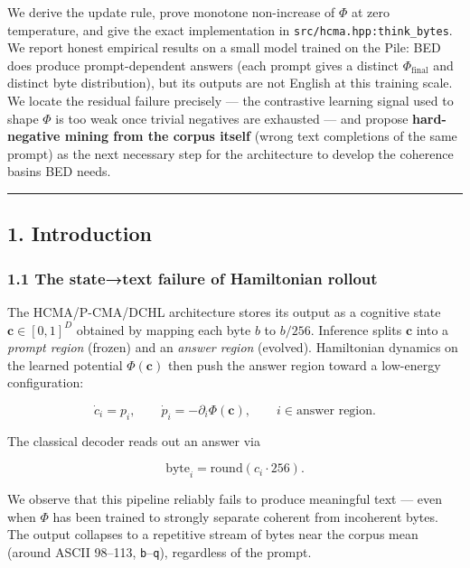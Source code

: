 \documentclass[
  11pt,
  a4paper,
]{article}
\begin{document}
We derive the update rule, prove monotone non-increase of \(\Phi\) at
zero temperature, and give the exact implementation in
\texttt{src/hcma.hpp:think\_bytes}. We report honest empirical results
on a small model trained on the Pile: BED does produce prompt-dependent
answers (each prompt gives a distinct \(\Phi_{\text{final}}\) and
distinct byte distribution), but its outputs are not English at this
training scale. We locate the residual failure precisely --- the
contrastive learning signal used to shape \(\Phi\) is too weak once
trivial negatives are exhausted --- and propose \textbf{hard-negative
mining from the corpus itself} (wrong text completions of the same
prompt) as the next necessary step for the architecture to develop the
coherence basins BED needs.

\begin{center}\rule{0.5\linewidth}{0.5pt}\end{center}

\subsection{1. Introduction}\label{introduction}

\subsubsection{1.1 The state→text failure of Hamiltonian
rollout}\label{the-statetext-failure-of-hamiltonian-rollout}

The HCMA/P-CMA/DCHL architecture stores its output as a cognitive state
\(\mathbf{c} \in [0,1]^D\) obtained by mapping each byte \(b\) to
\(b/256\). Inference splits \(\mathbf{c}\) into a \emph{prompt region}
(frozen) and an \emph{answer region} (evolved). Hamiltonian dynamics on
the learned potential \(\Phi(\mathbf{c})\) then push the answer region
toward a low-energy configuration:

\[
\dot{c}_i = p_i, \qquad \dot{p}_i = -\partial_i \Phi(\mathbf{c}), \qquad i \in \text{answer region}.
\]

The classical decoder reads out an answer via

\[
\text{byte}_i = \text{round}(c_i \cdot 256).
\]

We observe that this pipeline reliably fails to produce meaningful text
--- even when \(\Phi\) has been trained to strongly separate coherent
from incoherent bytes. The output collapses to a repetitive stream of
bytes near the corpus mean (around ASCII 98--113,
\texttt{b}--\texttt{q}), regardless of the prompt.
\end{document}
